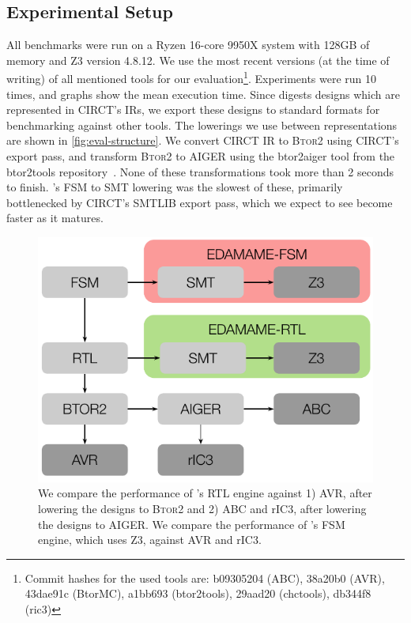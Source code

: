 \documentclass[acmsmall,screen,review]{acmart}
\begin{document}
\subsection{Experimental Setup}
All benchmarks were run on a Ryzen 16-core 9950X system with 128GB of memory and Z3 version 4.8.12.
We use the most recent versions (at the time of writing) of all mentioned tools for our evaluation\footnote{Commit hashes for the used tools are:
  b09305204 (ABC), 38a20b0 (AVR), 43dae91c (BtorMC), a1bb693 (btor2tools), 29aad20 (chctools), db344f8 (ric3)
}.
Experiments were run 10 times, and graphs show the mean execution time.
Since \toolname{} digests designs which are represented in CIRCT's IRs, we export these designs to standard formats for benchmarking against other tools.
The lowerings we use between representations are shown in \autoref{fig:eval-structure}.
We convert CIRCT IR to B\textsc{tor}2 using CIRCT's export pass, and transform B\textsc{tor}2 to AIGER using the btor2aiger tool from the btor2tools repository~\cite{btor2tools}.
None of these transformations took more than 2 seconds to finish.
\toolname{}'s FSM to SMT lowering was the slowest of these, primarily bottlenecked by CIRCT's SMTLIB export pass, which we expect to see become faster as it matures.

\begin{figure}[t]
  \centering
  \includegraphics[width=0.8\columnwidth]{methodology.pdf}
  \caption{We compare the performance of \toolname{}'s RTL engine against 1) AVR, after lowering the designs to B\textsc{tor}2 and 2) ABC and rIC3, after lowering the designs to AIGER.
           We compare the performance of \toolname{}'s FSM engine, which uses Z3, against AVR and rIC3.}
  \label{fig:eval-structure}
\end{figure}
\end{document}
